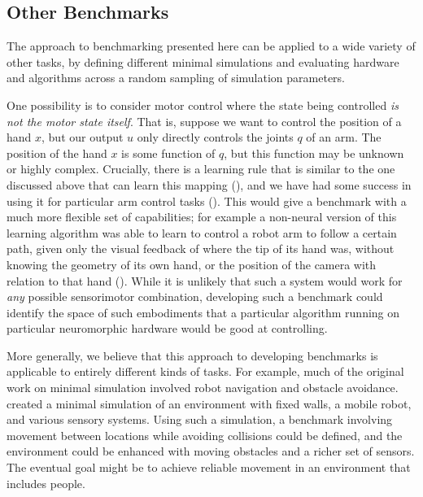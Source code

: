 \documentclass{frontiersSCNS} %
\begin{document}
\subsection{Other Benchmarks}

The approach to benchmarking presented here can be applied to a wide variety of other tasks,
by defining different minimal simulations and evaluating hardware and algorithms across a random sampling
of simulation parameters.  

One possibility is to consider motor control where
the state being controlled \emph{is not the motor state itself}.  That is,
suppose we want to control the position of a hand $x$, but our output $u$
only directly controls the joints $q$ of an arm.  The position of the hand $x$
is some function of $q$, but this function may be unknown or highly complex.
Crucially, there is a learning rule that is similar to the one discussed above
that can learn this mapping (\citealt{adaptiveJacobian}), and we have had
some success in using it for particular arm control tasks (\citealt{dewolf2014}).
This would give a benchmark with a much more flexible set of capabilities;
for example a non-neural version of this learning algorithm was able to
learn to control a robot arm to follow a certain path, given only the
visual feedback of where the tip of its hand was, without knowing the
geometry of its own hand, or the position of the camera with relation to that
hand (\citealt{adaptiveJacobian}).  While it is unlikely that such a
system would work for \emph{any} possible sensorimotor combination, developing
such a benchmark could identify the space of such embodiments that a
particular algorithm running on particular neuromorphic hardware would be
good at controlling.

More generally, we believe that this approach to developing benchmarks is applicable
to entirely different kinds of tasks.  For example, much of the original work
on minimal simulation involved robot navigation and obstacle avoidance.  
\cite{Jakobi97evolutionaryrobotics} created a
minimal simulation of an environment with fixed walls, a mobile robot, and
various sensory systems.  Using such a simulation, a benchmark involving movement between locations
while avoiding collisions could be defined, and the environment could be
enhanced with moving obstacles and a richer set of sensors.  The eventual
goal might be to achieve reliable movement in an environment that includes
people.
\end{document}
